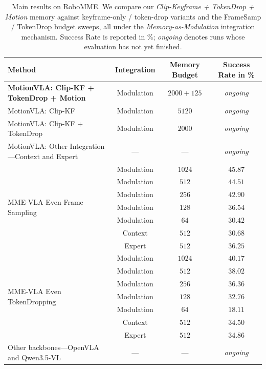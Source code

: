 \documentclass{article}
\begin{document}
\begin{table}[t]
  \caption{Main results on RoboMME. We compare our \emph{Clip-Keyframe
  + TokenDrop + Motion} memory against keyframe-only / token-drop
  variants and the FrameSamp / TokenDrop budget sweeps, all under the
  \emph{Memory-as-Modulation} integration mechanism. Success Rate is
  reported in \%; \textit{ongoing} denotes runs whose evaluation has
  not yet finished.}
  \label{tab:main}
  \centering
  \footnotesize
  \setlength{\tabcolsep}{4pt}
  \begin{tabular}{lccc}
    \toprule
    Method & Integration & Memory Budget & Success Rate in \% \\
    \midrule
    \textbf{MotionVLA: Clip-KF + TokenDrop + Motion} & Modulation & $2000{+}125$ & \textit{ongoing} \\
    MotionVLA: Clip-KF                                     & Modulation & $5120$    & \textit{ongoing} \\
     MotionVLA: Clip-KF + TokenDrop                          & Modulation & $2000$       & \textit{ongoing} \\
    MotionVLA: Other Integration---Context and Expert         & ---        & ---          & \textit{ongoing} \\
    \midrule
    \multirow{7}{*}{MME-VLA Even Frame Sampling}
        & Modulation & $1024$ & $45.87$ \\
        & Modulation & $512$  & $44.51$ \\
        & Modulation & $256$  & $42.90$ \\
        & Modulation & $128$  & $36.54$ \\
        & Modulation & $64$   & $30.42$ \\
        & Context    & $512$  & $30.68$ \\
        & Expert     & $512$  & $36.25$ \\
    \midrule
    \multirow{7}{*}{MME-VLA Even TokenDropping}
        & Modulation & $1024$ & $40.17$ \\
        & Modulation & $512$  & $38.02$ \\
        & Modulation & $256$  & $36.36$ \\
        & Modulation & $128$  & $32.76$ \\
        & Modulation & $64$   & $18.11$ \\
        & Context    & $512$  & $34.50$ \\
        & Expert     & $512$  & $34.86$ \\
    \midrule
    Other backbones---OpenVLA and Qwen3.5-VL & --- & --- & \textit{ongoing} \\
    \bottomrule
  \end{tabular}
\end{table}
\end{document}
